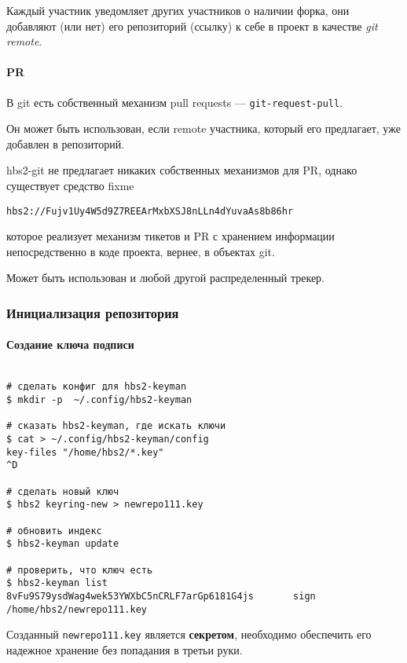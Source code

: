 \documentclass[11pt,a4paper]{article}
\begin{document}
Каждый участник уведомляет других участников о наличии форка,
они добавляют (или нет) его репозиторий (ссылку) к себе в проект
в качестве \textit{git remote}.

\paragraph{PR}

В git есть собственный механизм pull requests --- \texttt{git-request-pull}.

Он может быть использован, если remote участника, который его предлагает,
уже добавлен в репозиторий.

hbs2-git не предлагает никаких собственных механизмов для PR, однако
существует средство fixme

\texttt{hbs2://Fujv1Uy4W5d9Z7REEArMxbXSJ8nLLn4dYuvaAs8b86hr}

которое реализует механизм тикетов и PR с хранением информации непосредственно
в коде проекта, вернее, в объектах git.

Может быть использован и любой другой распределенный трекер.

\subsubsection{Инициализация репозитория}

\paragraph{Создание ключа подписи}

\begin{verbatim}

# сделать конфиг для hbs2-keyman
$ mkdir -p  ~/.config/hbs2-keyman

# сказать hbs2-keyman, где искать ключи
$ cat > ~/.config/hbs2-keyman/config
key-files "/home/hbs2/*.key"
^D

# сделать новый ключ
$ hbs2 keyring-new > newrepo111.key

# обновить индекс
$ hbs2-keyman update

# проверить, что ключ есть
$ hbs2-keyman list
8vFu9S79ysdWag4wek53YWXbC5nCRLF7arGp6181G4js       sign       /home/hbs2/newrepo111.key

\end{verbatim}

Созданный \texttt{newrepo111.key} является \textbf{секретом}, необходимо обеспечить его надежное
хранение без попадания в третьи руки.
\end{document}
